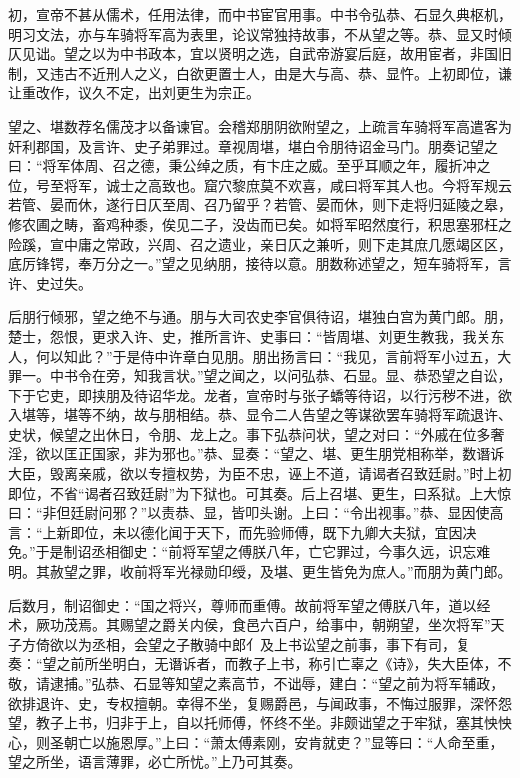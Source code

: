\documentclass[12pt,UTF8]{ctexbook}
\begin{document}
初，宣帝不甚从儒术，任用法律，而中书宦官用事。中书令弘恭、石显久典枢机，明习文法，亦与车骑将军高为表里，论议常独持故事，不从望之等。恭、显又时倾仄见诎。望之以为中书政本，宜以贤明之选，自武帝游宴后庭，故用宦者，非国旧制，又违古不近刑人之义，白欲更置士人，由是大与高、恭、显忤。上初即位，谦让重改作，议久不定，出刘更生为宗正。



望之、堪数荐名儒茂才以备谏官。会稽郑朋阴欲附望之，上疏言车骑将军高遣客为奸利郡国，及言许、史子弟罪过。章视周堪，堪白令朋待诏金马门。朋奏记望之曰：“将军体周、召之德，秉公绰之质，有卞庄之威。至乎耳顺之年，履折冲之位，号至将军，诚士之高致也。窟穴黎庶莫不欢喜，咸曰将军其人也。今将军规云若管、晏而休，遂行日仄至周、召乃留乎？若管、晏而休，则下走将归延陵之皋，修农圃之畴，畜鸡种黍，俟见二子，没齿而已矣。如将军昭然度行，积思塞邪枉之险蹊，宣中庸之常政，兴周、召之遗业，亲日仄之兼听，则下走其庶几愿竭区区，底厉锋锷，奉万分之一。”望之见纳朋，接待以意。朋数称述望之，短车骑将军，言许、史过失。



后朋行倾邪，望之绝不与通。朋与大司农史李官俱待诏，堪独白宫为黄门郎。朋，楚士，怨恨，更求入许、史，推所言许、史事曰：“皆周堪、刘更生教我，我关东人，何以知此？”于是侍中许章白见朋。朋出扬言曰：“我见，言前将军小过五，大罪一。中书令在旁，知我言状。”望之闻之，以问弘恭、石显。显、恭恐望之自讼，下于它吏，即挟朋及待诏华龙。龙者，宣帝时与张子蟜等待诏，以行污秽不进，欲入堪等，堪等不纳，故与朋相结。恭、显令二人告望之等谋欲罢车骑将军疏退许、史状，候望之出休日，令朋、龙上之。事下弘恭问状，望之对曰：“外戚在位多奢淫，欲以匡正国家，非为邪也。”恭、显奏：“望之、堪、更生朋党相称举，数谮诉大臣，毁离亲戚，欲以专擅权势，为臣不忠，诬上不道，请谒者召致廷尉。”时上初即位，不省“谒者召致廷尉”为下狱也。可其奏。后上召堪、更生，曰系狱。上大惊曰：“非但廷尉问邪？”以责恭、显，皆叩头谢。上曰：“令出视事。”恭、显因使高言：“上新即位，未以德化闻于天下，而先验师傅，既下九卿大夫狱，宜因决免。”于是制诏丞相御史：“前将军望之傅朕八年，亡它罪过，今事久远，识忘难明。其赦望之罪，收前将军光禄勋印绶，及堪、更生皆免为庶人。”而朋为黄门郎。



后数月，制诏御史：“国之将兴，尊师而重傅。故前将军望之傅朕八年，道以经术，厥功茂焉。其赐望之爵关内侯，食邑六百户，给事中，朝朔望，坐次将军”天子方倚欲以为丞相，会望之子散骑中郎亻及上书讼望之前事，事下有司，复奏：“望之前所坐明白，无谮诉者，而教子上书，称引亡辜之《诗》，失大臣体，不敬，请逮捕。”弘恭、石显等知望之素高节，不诎辱，建白：“望之前为将军辅政，欲排退许、史，专权擅朝。幸得不坐，复赐爵邑，与闻政事，不悔过服罪，深怀怨望，教子上书，归非于上，自以托师傅，怀终不坐。非颇诎望之于牢狱，塞其怏怏心，则圣朝亡以施恩厚。”上曰：“萧太傅素刚，安肯就吏？”显等曰：“人命至重，望之所坐，语言薄罪，必亡所忧。”上乃可其奏。
\end{document}
